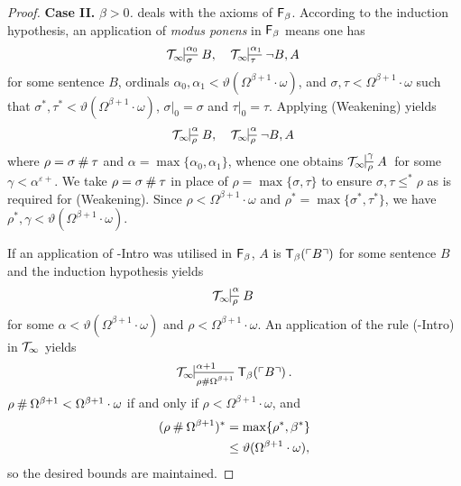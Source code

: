 \documentclass[UKenglish,cleveref,DIV=12]{scrartcl}
\theoremstyle{definition}
\theoremstyle{definition}
\begin{document}
\begin{proof}
\noindent\textbf{Case II.} \textit{${\beta>0}$.}
 deals with the axioms of $\mathsf{F}_\beta$. According to the
induction hypothesis, an application of {\em modus ponens} in $\mathsf{F}_\beta$ means one has
\begin{align*}%
 \Tinfty\prov{\alpha_0}{\sigma}{B,}&&   \Tinfty\prov{\alpha_1}{\tau}{\lnot B,A}
\end{align*}
for some sentence $B$, ordinals
$\alpha_0,\alpha_1<\vartheta(\Omega^{\beta+1}\cdot\omega)$, and
$\sigma,\tau<\Omega^{\beta+1}\cdot\omega$ such that
$\sigma^*,\tau^*<\vartheta(\Omega^{\beta+1}\cdot\omega)$, $\sigma|_0=\sigma$ and $\tau|_0=\tau$. Applying (Weakening)
yields
\begin{align*}%
 \Tinfty\prov{\alpha}{\rho}{B,}& &\Tinfty\prov{\alpha}{\rho}{\lnot B,A}
\end{align*}
where $\rho=\sigma\mathbin{\#}\tau$ and $\alpha=\max\{\alpha_0,\alpha_1\}$, whence one obtains
$\Tinfty\prov\gamma\rho A$ for some $\gamma<\alpha^{\varepsilon+}$. We
take $\rho=\sigma\mathbin{\#}\tau$ in place of $\rho=\max\{\sigma,\tau\}$ to ensure
$\sigma,\tau\le^* \rho$ as is required for (Weakening). Since
$\rho<\Omega^{\beta+1}\cdot\omega$ and  $\rho^*=\max\{\sigma^*,\tau^*\}$, we have
$\rho^*,\gamma<\vartheta(\Omega^{\beta+1}\cdot\omega)$.

If an application of \textT\beta-Intro was utilised in $\mathsf{F}_\beta$, $A$ is $\mathsf{T}_\beta(\ulcorner{B}\urcorner)$ for some sentence $B$ and the induction hypothesis yields
\begin{align*}
 \Tinfty\prov\alpha\rho B
\end{align*}
for some $\alpha<\vartheta(\Omega^{\beta+1}\cdot\omega)$ and
$\rho<\Omega^{\beta+1}\cdot\omega$. An application of the rule (\textT\beta-Intro)
in $\mathcal{T}_\infty$ yields
\begin{align*}
  \Tinfty\prov{\alpha+1}{\rho\nsum\Omega^{\beta+1}} {\T_\beta(\gn B)}.
\end{align*}
$\rho\mathbin{\#}\Omega^{\beta+1}<\Omega^{\beta+1}\cdot\omega$ if and only if
$\rho<\Omega^{\beta+1}\cdot\omega$, and
\begin{align*}
  (\rho\mathbin{\#}\Omega^{\beta+1})^*&=\max\{\rho^*,\beta^*\}\\
	&\le\vartheta(\Omega^{\beta+1}\cdot\omega),
\end{align*}
so the desired bounds are maintained.


\end{proof}
\end{document}
